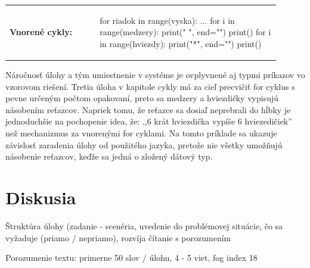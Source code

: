 \vspace{-2em}
\begin{tabular}{@{}p{0.3\linewidth}p{0.6\linewidth}}
\textbf{\small Vnorené cykly:} &
\vspace{-3em}
\begin{code}
for riadok in range(vyska):
	...
	for i in range(medzery):
		print(" ", end="")
	print()
	for i in range(hviezdy):
		print("*", end="")
	print()
\end{code}
\end{tabular}

Náročnosť úlohy a tým umiestnenie v systéme je ovplyvnené aj typmi príkazov vo vzorovom riešení. Tretia úloha v kapitole cykly má za cieľ precvičiť for cyklus s pevne určeným počtom opakovaní, preto sa medzery a hviezdičky vypisujú násobením reťazcov. Napriek tomu, že reťazce sa dosiaľ neprebrali do hĺbky je jednoduchšie na pochopenie idea, že: ,,6 krát hviezdička vypíše 6 hviezedičiek'' než mechanizmus za vnorenými for cyklami. Na tomto príklade sa ukazuje závislosť zaradenia úlohy od použitého jazyka, pretože nie všetky umožňujú násobenie reťazcov, keďže sa jedná o zložený dátový typ.

\section{Diskusia}


Štruktúra úlohy (zadanie - scenéria, uvedenie do problémovej situácie, čo sa vyžaduje (priamo / nepriamo), rozvíja čítanie s porozumením

Porozumenie textu: primerne 50 slov / úlohu, 4 - 5 viet, fog index 18

